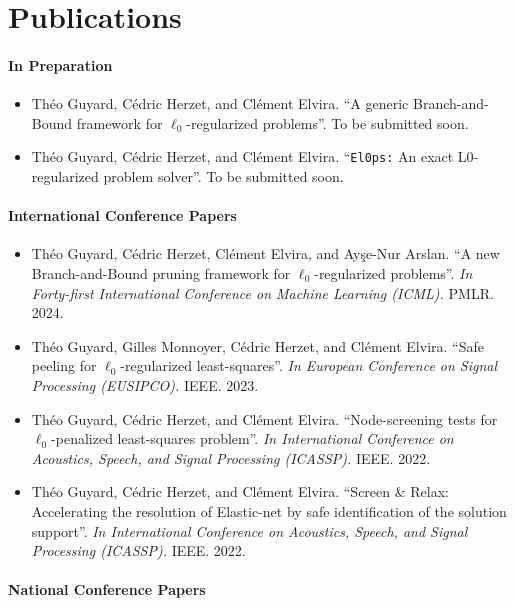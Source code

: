 \section{Publications}

\paragraph*{In Preparation}

\begin{itemize}[nosep]
    \item Théo Guyard, Cédric Herzet, and Clément Elvira. ``A generic Branch-and-Bound framework for $\ell_0$-regularized problems''. To be submitted soon.
    \item Théo Guyard, Cédric Herzet, and Clément Elvira. ``\texttt{El0ps:} An exact L0-regularized problem solver''. To be submitted soon.
\end{itemize}

\paragraph*{International Conference Papers}

\begin{itemize}
    \item Théo Guyard, Cédric Herzet, Clément Elvira, and Ay\c{s}e-Nur Arslan. ``A new Branch-and-Bound pruning framework for $\ell_0$-regularized problems''. \textit{In Forty-first International Conference on Machine Learning (ICML).} PMLR. 2024.
    \item Théo Guyard, Gilles Monnoyer, Cédric Herzet,  and Clément Elvira. ``Safe peeling for $\ell_0$-regularized least-squares''. \textit{In European Conference on Signal Processing (EUSIPCO).} IEEE. 2023.
    \item Théo Guyard, Cédric Herzet, and Clément Elvira. ``Node-screening tests for $\ell_0$-penalized least-squares problem''. \textit{In International Conference on Acoustics, Speech, and Signal Processing (ICASSP).} IEEE. 2022.
    \item Théo Guyard, Cédric Herzet, and Clément Elvira. ``Screen \& Relax: Accelerating the resolution of Elastic-net by safe identification of the solution support''. \textit{In International Conference on Acoustics, Speech, and Signal Processing (ICASSP).} IEEE. 2022.
\end{itemize}

\paragraph*{National Conference Papers}

